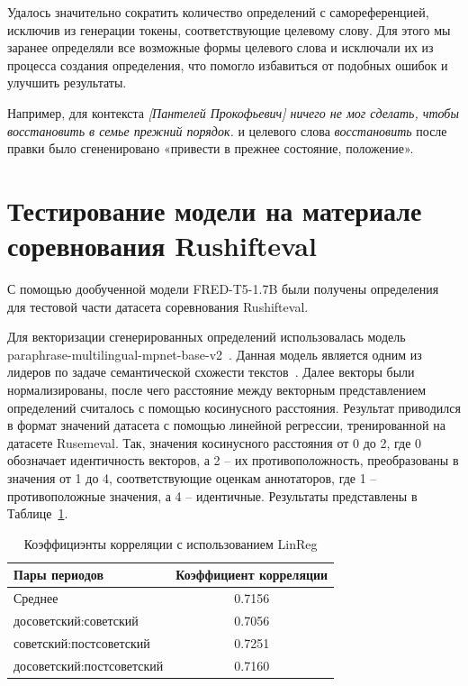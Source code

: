 \documentclass[LI,VKR]{HSEUniversity}
\begin{document}
Удалось значительно сократить количество определений с самореференцией,
исключив из генерации токены, соответствующие целевому слову.
Для этого мы заранее определяли все возможные формы целевого слова и
исключали их из процесса создания определения,
что помогло избавиться от подобных ошибок и улучшить результаты.

%
Например, для контекста \textit{[Пантелей Прокофьевич] ничего не мог сделать, чтобы восстановить в семье прежний порядок.}
и целевого слова \textit{восстановить} после правки было сгененировано
«привести в прежнее состояние, положение».

\section{Тестирование модели на материале соревнования Rushifteval}

С помощью дообученной модели FRED-T5-1.7B были получены определения для тестовой части датасета
соревнования Rushifteval.

Для векторизации сгенерированных определений использовалась модель paraphrase-multilingual-mpnet-base-v2~.
Данная модель является одним из лидеров по задаче семантической схожести текстов~.
Далее векторы были нормализированы, после чего расстояние между
векторным представлением определений считалось с помощью косинусного расстояния.
Результат приводился в формат значений датасета с помощью линейной регрессии,
тренированной на датасете Rusemeval.
Так, значения косинусного расстояния от 0 до 2, где 0 обозначает идентичность векторов,
а 2 – их противоположность, преобразованы в значения от 1 до 4,
соответствующие оценкам аннотаторов, где 1 – противоположные значения, а 4 – идентичные.
Результаты представлены в Таблице~\ref{tab:Rushifteval results default}.

\begin{table}[H]
\centering
\caption{Коэффициэнты корреляции с использованием LinReg}
\label{tab:Rushifteval results default}
\begin{tabular}{|l|c|}
\hline
\textbf{Пары периодов}                  & \textbf{Коэффициент корреляции} \\
\hline
Среднее            & 0.7156                  \\
\hline
досоветский:советский           & 0.7056                  \\
\hline
советский:постсоветский          & 0.7251                  \\
\hline
досоветский:постсоветский      & 0.7160                  \\
\hline
\end{tabular}
\end{table}
\end{document}
